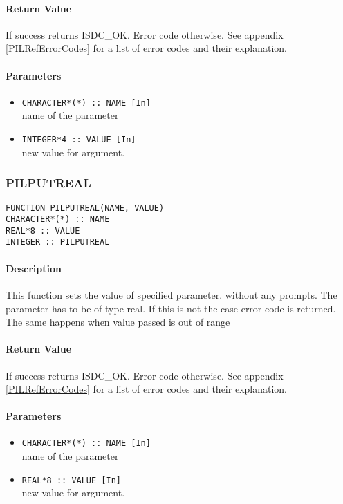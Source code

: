 \paragraph{Return Value\\}
If success returns ISDC\_OK. Error code otherwise. See appendix \ref{PILRefErrorCodes}
for a list of error codes and their explanation.

\paragraph{Parameters}
\begin{itemize}
\item
{\tt CHARACTER*(*) :: NAME [In] } \\
name of the parameter 
\item
{\tt INTEGER*4 :: VALUE [In] } \\
new value for argument. 
\end{itemize}



\subsubsection{PILPUTREAL}

\begin{verbatim}
FUNCTION PILPUTREAL(NAME, VALUE) 
CHARACTER*(*) :: NAME 
REAL*8 :: VALUE 
INTEGER :: PILPUTREAL 
\end{verbatim}

\paragraph{Description\\}
This function sets the value of specified parameter. without any prompts.
The parameter has to be of type real.
If this is not the case error code is returned. The same happens when value
passed is out of range

\paragraph{Return Value\\}
If success returns ISDC\_OK. Error code otherwise. See appendix \ref{PILRefErrorCodes}
for a list of error codes and their explanation.

\paragraph{Parameters}
\begin{itemize}
\item
{\tt CHARACTER*(*) :: NAME [In] } \\
name of the parameter 
\item
{\tt REAL*8 :: VALUE [In] } \\
new value for argument. 
\end{itemize}



